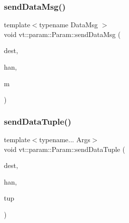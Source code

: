 \subsubsection{\texorpdfstring{send\+Data\+Msg()}{sendDataMsg()}}
{\footnotesize\ttfamily template$<$typename Data\+Msg $>$ \\
void vt\+::param\+::\+Param\+::send\+Data\+Msg (\begin{DoxyParamCaption}\item[{\hyperlink{namespacevt_a866da9d0efc19c0a1ce79e9e492f47e2}{Node\+Type} const \&}]{dest,  }\item[{\hyperlink{namespacevt_af64846b57dfcaf104da3ef6967917573}{Handler\+Type} const \&\+\_\+\+\_\+attribute\+\_\+\+\_\+((unused))}]{han,  }\item[{\hyperlink{namespacevt_ab2b3d506ec8e8d1540aede826d84a239}{Msg\+Shared\+Ptr}$<$ \hyperlink{structvt_1_1param_1_1_data_msg}{Data\+Msg} $>$}]{m }\end{DoxyParamCaption})\hspace{0.3cm}{\ttfamily [inline]}}

\mbox{\label{structvt_1_1param_1_1_param_ac12a098c0d64dcd483cdb590874e45ca}} 
\subsubsection{\texorpdfstring{send\+Data\+Tuple()}{sendDataTuple()}}
{\footnotesize\ttfamily template$<$typename... Args$>$ \\
void vt\+::param\+::\+Param\+::send\+Data\+Tuple (\begin{DoxyParamCaption}\item[{\hyperlink{namespacevt_a866da9d0efc19c0a1ce79e9e492f47e2}{Node\+Type} const \&}]{dest,  }\item[{\hyperlink{namespacevt_af64846b57dfcaf104da3ef6967917573}{Handler\+Type} const \&}]{han,  }\item[{std\+::tuple$<$ Args... $>$ \&\&}]{tup }\end{DoxyParamCaption})\hspace{0.3cm}{\ttfamily [inline]}}

\mbox{\label{structvt_1_1param_1_1_param_a8d670f74eb5f0a1b5ea312e8b174b648}} 
